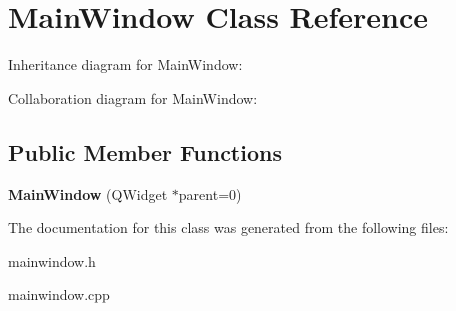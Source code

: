 \hypertarget{classMainWindow}{}\section{Main\+Window Class Reference}
\label{classMainWindow}


Inheritance diagram for Main\+Window\+:


Collaboration diagram for Main\+Window\+:
\subsection*{Public Member Functions}
\begin{DoxyCompactItemize}
\item 
\mbox{\label{classMainWindow_a8b244be8b7b7db1b08de2a2acb9409db}} 
{\bfseries Main\+Window} (Q\+Widget $\ast$parent=0)
\end{DoxyCompactItemize}


The documentation for this class was generated from the following files\+:\begin{DoxyCompactItemize}
\item 
mainwindow.\+h\item 
mainwindow.\+cpp\end{DoxyCompactItemize}
